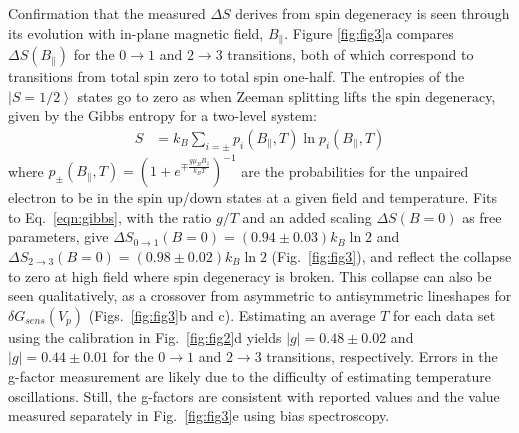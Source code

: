 \documentclass[twocolumn,showpacs,amsmath,amssymb,prl,aps,superscriptaddress]{revtex4-1}
\newcommand{\ket}[1]{\ensuremath{\left|#1\right\rangle}}
\begin{document}
Confirmation that the measured $\Delta S$ derives from spin degeneracy is seen through its evolution with in-plane magnetic field, $B_\parallel$. Figure \ref{fig:fig3}a compares $\Delta S(B_\parallel)$ for the $0 \rightarrow1 $ and $2 \rightarrow 3$ transitions, both of which correspond to transitions from total spin zero to total spin one-half. The entropies of the $\ket{S=1/2}$ states go to zero as when Zeeman splitting lifts the spin degeneracy, given by the Gibbs entropy for a two-level system:
%
\begin{align}
\label{eqn:gibbs}
        S &= k_B \sum_{i=\pm} p_{i}(B_\parallel, T) \ln{ p_{i}(B_\parallel,T) }
\end{align}
%
where $p_{\pm}(B_\parallel, T) = (1+ e^{\mp \frac{g\mu_B B_{\parallel}}{k_B T}})^{-1}$ are the probabilities for the unpaired electron to be in the spin up/down states at a given field and temperature. Fits to Eq.~\ref{eqn:gibbs}, with the ratio $g/T$ and an added scaling $\Delta S(B=0)$ as free parameters, give $\Delta S_{0 \rightarrow 1}(B=0)=(0.94 \pm 0.03) k_B \ln{2}$ and $\Delta S_{2 \rightarrow 3}(B=0)=(0.98 \pm 0.02) k_B \ln{2}$ (Fig.~\ref{fig:fig3}), and reflect the collapse to zero at high field where spin degeneracy is broken. This collapse can also be seen qualitatively, as a crossover from asymmetric to antisymmetric lineshapes for $\delta G_{sens}(V_p)$ (Figs.~\ref{fig:fig3}b and c). Estimating an average $T$ for each data set using the calibration in Fig.~\ref{fig:fig2}d yields $|g|=0.48 \pm 0.02$ and $|g|=0.44 \pm 0.01 $ for the $0\rightarrow 1$ and $2\rightarrow 3$ transitions, respectively. Errors in the g-factor measurement are likely due to the difficulty of estimating temperature oscillations. Still, the g-factors are consistent with reported values\cite{Cronenwett1998,Hanson2003,Zumbuhl2004} and the value measured separately in Fig.~\ref{fig:fig3}e using bias spectroscopy.
\end{document}
